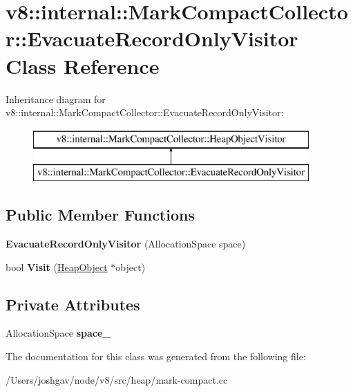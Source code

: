 \hypertarget{classv8_1_1internal_1_1_mark_compact_collector_1_1_evacuate_record_only_visitor}{}\section{v8\+:\+:internal\+:\+:Mark\+Compact\+Collector\+:\+:Evacuate\+Record\+Only\+Visitor Class Reference}
\label{classv8_1_1internal_1_1_mark_compact_collector_1_1_evacuate_record_only_visitor}
Inheritance diagram for v8\+:\+:internal\+:\+:Mark\+Compact\+Collector\+:\+:Evacuate\+Record\+Only\+Visitor\+:\begin{figure}[H]
\begin{center}
\leavevmode
\includegraphics[height=2.000000cm]{classv8_1_1internal_1_1_mark_compact_collector_1_1_evacuate_record_only_visitor}
\end{center}
\end{figure}
\subsection*{Public Member Functions}
\begin{DoxyCompactItemize}
\item 
{\bfseries Evacuate\+Record\+Only\+Visitor} (Allocation\+Space space)\hypertarget{classv8_1_1internal_1_1_mark_compact_collector_1_1_evacuate_record_only_visitor_a10b9ca3c43e9b8dbad8e08a542044868}{}\label{classv8_1_1internal_1_1_mark_compact_collector_1_1_evacuate_record_only_visitor_a10b9ca3c43e9b8dbad8e08a542044868}

\item 
bool {\bfseries Visit} (\hyperlink{classv8_1_1internal_1_1_heap_object}{Heap\+Object} $\ast$object)\hypertarget{classv8_1_1internal_1_1_mark_compact_collector_1_1_evacuate_record_only_visitor_aad19502beba5be872f07365511e3091c}{}\label{classv8_1_1internal_1_1_mark_compact_collector_1_1_evacuate_record_only_visitor_aad19502beba5be872f07365511e3091c}

\end{DoxyCompactItemize}
\subsection*{Private Attributes}
\begin{DoxyCompactItemize}
\item 
Allocation\+Space {\bfseries space\+\_\+}\hypertarget{classv8_1_1internal_1_1_mark_compact_collector_1_1_evacuate_record_only_visitor_a096c2d990b28d8bdaef95b9aa27d1bce}{}\label{classv8_1_1internal_1_1_mark_compact_collector_1_1_evacuate_record_only_visitor_a096c2d990b28d8bdaef95b9aa27d1bce}

\end{DoxyCompactItemize}


The documentation for this class was generated from the following file\+:\begin{DoxyCompactItemize}
\item 
/\+Users/joshgav/node/v8/src/heap/mark-\/compact.\+cc\end{DoxyCompactItemize}
